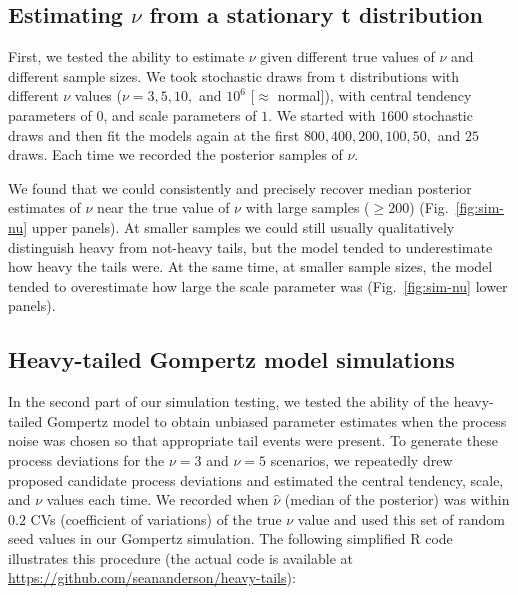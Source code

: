 \subsection{Estimating $\nu$ from a stationary t distribution}

First, we tested the ability to estimate $\nu$ given different true values of
$\nu$ and different sample sizes. We took stochastic draws from t
distributions with different $\nu$ values ($\nu = 3, 5, 10,$ and $10^6$
[$\approx$ normal]), with central tendency parameters of $0$, and scale
parameters of $1$. We started with $1600$ stochastic draws and then fit the
models again at the first $800, 400, 200, 100, 50,$ and $25$ draws. Each time
we recorded the posterior samples of $\nu$.

We found that we could consistently and precisely recover median posterior
estimates of $\nu$ near the true value of $\nu$ with large samples ($\ge 200$)
(Fig.~\ref{fig:sim-nu} upper panels). At smaller samples we could still
usually qualitatively distinguish heavy from not-heavy tails, but the model
tended to underestimate how heavy the tails were. At the same time, at smaller
sample sizes, the model tended to overestimate how large the scale parameter
was (Fig.~\ref{fig:sim-nu} lower panels).

\subsection{Heavy-tailed Gompertz model simulations}

In the second part of our simulation testing, we tested the ability of the
heavy-tailed Gompertz model to obtain unbiased parameter estimates when the
process noise was chosen so that appropriate tail events were present. To
generate these process deviations for the $\nu = 3$ and $\nu = 5$ scenarios,
we repeatedly drew proposed candidate process deviations and estimated the
central tendency, scale, and $\nu$ values each time. We recorded when
$\hat{\nu}$ (median of the posterior) was within $0.2$ CVs (coefficient of
variations) of the true $\nu$ value and used this set of random seed values in
our Gompertz simulation. The following simplified R code illustrates this
procedure (the actual code is available at
\url{https://github.com/seananderson/heavy-tails}):

